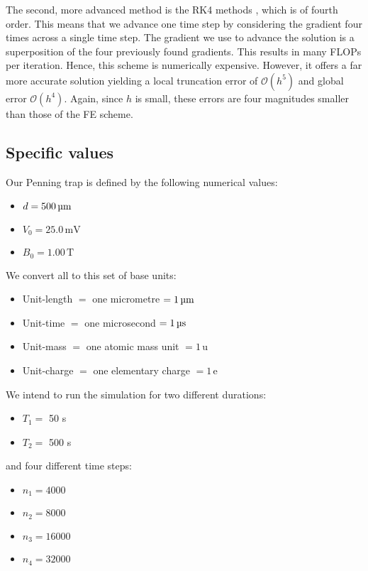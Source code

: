 The second, more advanced method is the RK4 methods \citep{Atkinson1989}, which is of fourth order. This means that we advance one time step by considering the gradient four times across a single time step. The gradient we use to advance the solution is a superposition of the four previously found gradients. This results in many FLOPs per iteration. Hence, this scheme is numerically expensive. However, it offers a far more accurate solution yielding a local truncation error of $\mathcal{O}(h^5)$ and global error $\mathcal{O}(h^4)$. Again, since $h$ is small, these errors are four magnitudes smaller than those of the FE scheme. 


\subsection{Specific values } 

Our Penning trap is defined by the following numerical values:

\begin{itemize}
    \item[] $d=500 \,\mathrm{\text{\textmu} m}$
    \item[] $V_0=25.0 \,\mathrm{mV}$
    \item[] $B_0=1.00 \,\mathrm{T}$
\end{itemize}

We convert all to this set of base units:

\begin{itemize}
    \item[] Unit-length $=$ one micrometre $= 1\, \mathrm{\text{\textmu}m} $ 
    \item[] Unit-time $=$ one microsecond $= 1\, \mathrm{\text{\textmu}s} $
    \item[] Unit-mass $=$ one atomic mass unit $= 1\, \mathrm{u} $
    \item[] Unit-charge $=$ one elementary charge $= 1\, \mathrm{e} $
\end{itemize}

We intend to run the simulation for two different durations:
\begin{itemize}
    \item[] $T_1 = $ 50 \textmu s
    \item[] $T_2 = $ 500 \textmu s
\end{itemize}
and four different time steps:
\begin{itemize}
    \item[] $n_1 = 4000$
    \item[] $n_2 = 8000$
    \item[] $n_3 = 16000$
    \item[] $n_4 = 32000$
\end{itemize}


